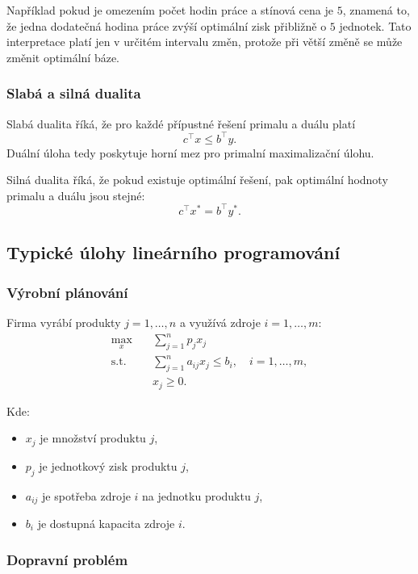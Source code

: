 Například pokud je omezením počet hodin práce a stínová cena je $5$, znamená to, že jedna dodatečná
hodina práce zvýší optimální zisk přibližně o $5$ jednotek. Tato interpretace platí jen v určitém
intervalu změn, protože při větší změně se může změnit optimální báze.

\subsubsection{Slabá a silná dualita}

Slabá dualita říká, že pro každé přípustné řešení primalu a duálu platí
\[
c^\top x \le b^\top y.
\]
Duální úloha tedy poskytuje horní mez pro primalní maximalizační úlohu.

Silná dualita říká, že pokud existuje optimální řešení, pak optimální hodnoty primalu a duálu jsou stejné:
\[
c^\top x^* = b^\top y^*.
\]

\subsection{Typické úlohy lineárního programování}

\subsubsection{Výrobní plánování}

Firma vyrábí produkty $j=1,\dots,n$ a využívá zdroje $i=1,\dots,m$:
\[
\begin{aligned}
\max_x \quad & \sum_{j=1}^n p_jx_j\\
\text{s.t.}\quad & \sum_{j=1}^n a_{ij}x_j\le b_i,\quad i=1,\dots,m,\\
& x_j\ge 0.
\end{aligned}
\]

Kde:
\begin{itemize}
    \item $x_j$ je množství produktu $j$,
    \item $p_j$ je jednotkový zisk produktu $j$,
    \item $a_{ij}$ je spotřeba zdroje $i$ na jednotku produktu $j$,
    \item $b_i$ je dostupná kapacita zdroje $i$.
\end{itemize}

\subsubsection{Dopravní problém}

